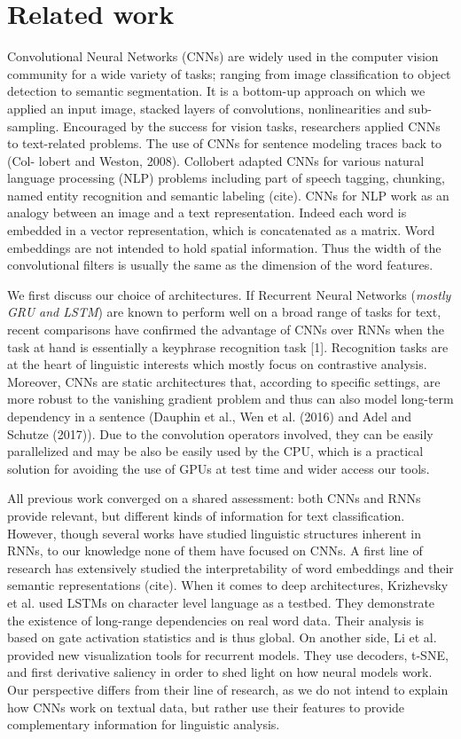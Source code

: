 \section{Related work}

Convolutional Neural Networks (CNNs) are widely used in the computer vision community for a wide variety of tasks; ranging from image classification to 
object detection to semantic segmentation. It is a bottom-up approach on which we applied an input image, stacked layers of convolutions, nonlinearities and sub-sampling.
Encouraged by the success for vision tasks, researchers applied CNNs to text-related problems. The use of CNNs for sentence modeling traces back to (Col-
lobert and Weston, 2008). Collobert adapted 
CNNs for various natural language processing (NLP) problems including part of speech tagging, chunking, named entity recognition and semantic labeling (cite). 
CNNs for NLP work as an analogy between an image and a text representation. Indeed each word is embedded in a vector representation, which is concatenated as a matrix. 
Word embeddings are not intended to hold spatial information. Thus the width of the convolutional filters is usually the same as the dimension of the word features.

We first discuss our choice of architectures. 
If Recurrent Neural Networks (\textit{mostly GRU and LSTM}) are known to perform well on a broad range of tasks for text, recent comparisons have confirmed the advantage of CNNs 
over RNNs when the task at hand is essentially a keyphrase recognition task [1]. Recognition tasks are at the heart of linguistic interests which mostly focus on contrastive analysis.
Moreover, CNNs are static architectures that, according to specific settings, are more robust 
to the vanishing gradient problem and thus can also model long-term dependency in a sentence (Dauphin et al.,  
Wen et al. (2016) and Adel and Schutze (2017)). Due to the convolution operators involved, 
they can be easily parallelized and may be also be easily used by the CPU, which is a practical solution for avoiding the use of GPUs at test time and wider access our tools.

 All previous work converged on a shared assessment: both CNNs and RNNs provide relevant, but different kinds of information for text classification. 
 However, though several works have studied linguistic structures inherent in RNNs, to our knowledge none of them have focused on CNNs. 
 A first line of research has extensively studied the interpretability of word embeddings and their semantic representations (cite). 
 When it comes to deep architectures, Krizhevsky et al. used LSTMs on character level language as a testbed. They demonstrate the existence of 
 long-range dependencies on real word data. Their analysis is based on gate activation statistics and is thus global. On another side, Li et al. 
 provided new visualization tools for recurrent models. They use decoders, t-SNE, and first derivative saliency in order to shed light on how neural models work.
Our perspective differs from their line of research, as we do not intend to explain how CNNs work on textual data, but rather use their features 
to provide complementary information for linguistic analysis.

